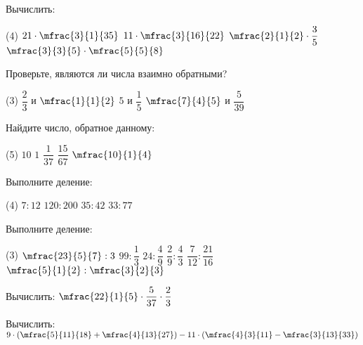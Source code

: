 %
%
\begin{homework}[number=1]
	\begin{listofex}
		\item Вычислить:
		\begin{tasks}(4)
			\task \( 21\cdot\mfrac{3}{1}{35} \)
			\task \( 11\cdot\mfrac{3}{16}{22} \)
			\task \( \mfrac{2}{1}{2}\cdot\dfrac{3}{5} \)
			\task \( \mfrac{3}{3}{5}\cdot\mfrac{5}{5}{8} \)
		\end{tasks}
		\item Проверьте, являются ли числа взаимно обратными?
		\begin{tasks}(3)
			\task \( \dfrac{2}{3} \) и \( \mfrac{1}{1}{2} \)
			\task \( 5 \) и \( \dfrac{1}{5} \)
			\task \( \mfrac{7}{4}{5} \) и \( \dfrac{5}{39} \)
		\end{tasks}
		\item Найдите число, обратное данному:
		\begin{tasks}(5)
			\task \( 10 \)
			\task \( 1 \)
			\task \( \dfrac{1}{37} \)
			\task \( \dfrac{15}{67} \)
			\task \( \mfrac{10}{1}{4} \)
		\end{tasks}
		\item Выполните деление:
		\begin{tasks}(4)
			\task \( 7:12 \)
			\task \( 120:200 \)
			\task \( 35:42 \)
			\task \( 33:77 \)
		\end{tasks}
		\item Выполните деление:
		\begin{tasks}(3)
			\task \( \mfrac{23}{5}{7}:3 \)
			\task \( 99:\dfrac{1}{3} \)
			\task \( 24:\dfrac{4}{9} \)
			\task \( \dfrac{2}{9}:\dfrac{4}{3} \)
			\task \( \dfrac{7}{12}:\dfrac{21}{16} \)
			\task \( \mfrac{5}{1}{2}:\mfrac{3}{2}{3} \)
		\end{tasks}
		\item Вычислить: \( \mfrac{22}{1}{5}\cdot\dfrac{5}{37}\cdot\dfrac{2}{3} \)
		\item Вычислить: \( 9\cdot\left( \mfrac{5}{11}{18}+\mfrac{4}{13}{27} \right) - 11\cdot\left( \mfrac{4}{3}{11}-\mfrac{3}{13}{33} \right) \)
	\end{listofex}
\end{homework}
%
%
